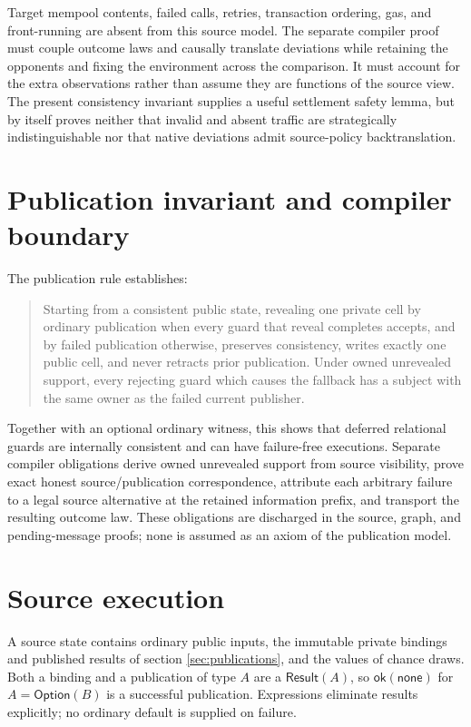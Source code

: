 \documentclass[11pt]{article}
\begin{document}
Target mempool contents, failed calls, retries, transaction ordering, gas, and
front-running are absent from this source model. The separate compiler proof must
couple outcome laws and causally translate deviations while retaining the
opponents and fixing the environment across the comparison. It must account
for the extra observations rather than assume they are functions of the source
view. The present consistency invariant supplies a useful
settlement safety lemma, but by itself proves neither that invalid and absent
traffic are strategically indistinguishable nor that native deviations admit
source-policy backtranslation.

\section{Publication invariant and compiler boundary}

The publication rule establishes:
\begin{quote}
Starting from a consistent public state, revealing one private cell by ordinary
publication when every guard that reveal completes accepts, and by failed
publication otherwise, preserves consistency, writes exactly one public cell,
and never retracts prior publication.  Under owned unrevealed support, every
rejecting guard which causes the fallback has a subject with the same owner as
the failed current publisher.
\end{quote}

Together with an optional ordinary witness, this shows that deferred relational
guards are internally consistent and can have failure-free executions. Separate
compiler obligations derive owned unrevealed support from source visibility,
prove exact honest source/publication correspondence, attribute each arbitrary
failure to a legal source alternative at the retained information prefix, and
transport the resulting outcome law. These obligations are discharged in the
source, graph, and pending-message proofs; none is assumed as an axiom of the
publication model.

\section{Source execution}
\label{sec:source}

A source state contains ordinary public inputs, the immutable private bindings
and published results of section \ref{sec:publications}, and the values of
chance draws. Both a binding and a publication of type $A$ are a
$\mathsf{Result}(A)$, so $\mathsf{ok}(\mathsf{none})$ for
$A=\mathsf{Option}(B)$ is a successful publication. Expressions eliminate
results explicitly; no ordinary default is supplied on failure.
\end{document}
